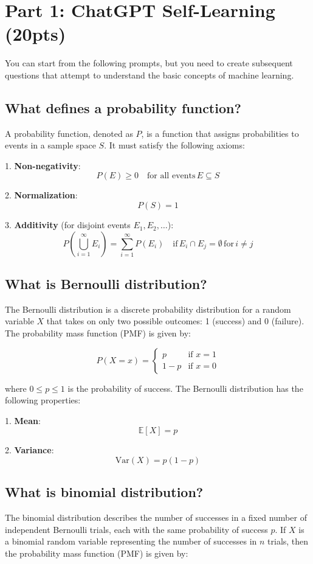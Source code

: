 \section{Part 1: ChatGPT Self-Learning (20pts)}

You can start from the following prompts, but you need to create subsequent questions that attempt to understand the basic concepts of machine learning.

\subsection{What defines a probability function?}
A probability function, denoted as $P$, is a function that assigns probabilities to events in a sample space $S$. It must satisfy the following axioms:

1. \textbf{Non-negativity}: 
   \[
   P(E) \geq 0 \quad \text{for all events} \, E \subseteq S
   \]
   
2. \textbf{Normalization}: 
   \[
   P(S) = 1
   \]
   
3. \textbf{Additivity} (for disjoint events $E_1, E_2, \dots$):
   \[
   P\left( \bigcup_{i=1}^{\infty} E_i \right) = \sum_{i=1}^{\infty} P(E_i) \quad \text{if} \, E_i \cap E_j = \emptyset \, \text{for} \, i \neq j
   \]


\subsection{What is Bernoulli distribution?}
The Bernoulli distribution is a discrete probability distribution for a random variable $X$ that takes on only two possible outcomes: 1 (success) and 0 (failure). The probability mass function (PMF) is given by:

\[
P(X = x) = 
\begin{cases} 
p & \text{if } x = 1 \\
1 - p & \text{if } x = 0 
\end{cases}
\]

where $0 \leq p \leq 1$ is the probability of success. The Bernoulli distribution has the following properties:

1. \textbf{Mean}: 
   \[
   \mathbb{E}[X] = p
   \]

2. \textbf{Variance}: 
   \[
   \text{Var}(X) = p(1 - p)
   \]

\subsection{What is binomial distribution?}
The binomial distribution describes the number of successes in a fixed number of independent Bernoulli trials, each with the same probability of success $p$. If $X$ is a binomial random variable representing the number of successes in $n$ trials, then the probability mass function (PMF) is given by:

